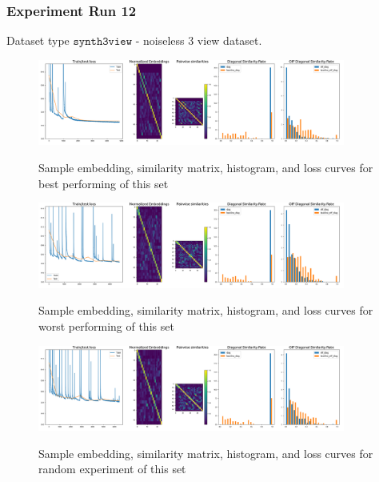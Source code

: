 \documentclass[a4paper]{article}
\begin{document}
\subsubsection*{Experiment Run 12}
Dataset type $\texttt{synth3view}$ - noiseless 3 view dataset.

\begin{figure}[H]
  \includegraphics[width=0.9\textwidth]{figures/synth-3view-skip-relu-unsup-false-0}
  \label{fig:synth-3view-skip-relu-unsup-false-0-sub1}
  \caption{Sample embedding, similarity matrix, histogram, and loss curves for best performing of this set}
\end{figure}
\begin{figure}[H]
  \includegraphics[width=0.9\textwidth]{figures/synth-3view-skip-leakyrelu-unsup-true-0}
  \label{fig:synth-3view-skip-leakyrelu-unsup-true-0-sub1}
  \caption{Sample embedding, similarity matrix, histogram, and loss curves for worst performing of this set}
\end{figure}
\begin{figure}[H]
  \includegraphics[width=0.9\textwidth]{figures/synth-3view-skip-relu-unsup-true-0}
  \label{fig:synth-3view-skip-relu-unsup-true-0-sub1}
  \caption{Sample embedding, similarity matrix, histogram, and loss curves for random experiment of this set}
\end{figure}
\end{document}
